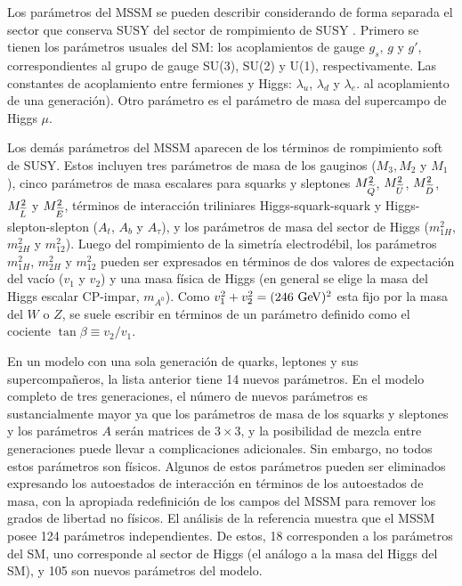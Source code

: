 Los parámetros del MSSM se pueden describir considerando de forma separada el
sector que conserva SUSY del sector de rompimiento de SUSY
\cite{PDG,Haber:1993wf}. Primero se tienen los parámetros usuales del SM: los
acoplamientos de gauge $g_s$, $g$ y $g'$, correspondientes al grupo de gauge
SU(3), SU(2) y U(1), respectivamente. Las constantes de acoplamiento entre
fermiones y Higgs: $\lambda_u$, $\lambda_d$ y $\lambda_e$. %
al acoplamiento de una generación).
Otro parámetro es el parámetro de masa del supercampo de Higgs $\mu$.

Los demás parámetros del MSSM aparecen de los términos de rompimiento soft de
SUSY. Estos incluyen tres parámetros de masa de los gauginos ($M_3, M_2$ y
$M_1$), cinco parámetros de masa escalares para squarks y sleptones
$M^2_{\widetilde{Q}}$, $M^2_{\widetilde{U}}$, $M^2_{\widetilde{D}}$, $M^2_{\widetilde{L}}$ y
$M^2_{\widetilde{E}}$, términos de interacción triliniares Higgs-squark-squark y
Higgs-slepton-slepton ($A_t$, $A_b$ y $A_\tau$), y los parámetros de masa del
sector de Higgs ($m^2_{1H}$, $m^2_{2H}$ y $m^2_{12}$). Luego del rompimiento de
la simetría electrodébil, los parámetros $m^2_{1H}$, $m^2_{2H}$ y $m^2_{12}$
pueden ser expresados en términos de dos valores de expectación del vacío ($v_1$
y $v_2$) y una masa física de Higgs (en general se elige la masa del Higgs
escalar CP-impar, $m_{A^0}$). Como $v_1^2+v_2^2=(246 \gev)^2$ esta fijo por la
masa del $W$ o $Z$, se suele escribir en términos de un parámetro definido como
el cociente $\tan \beta \equiv v_2/v_1$.

En un modelo con una sola generación de quarks, leptones y sus
supercompa\~neros, la lista anterior tiene 14 nuevos parámetros. En el modelo
completo de tres generaciones, el número de nuevos parámetros es sustancialmente
mayor ya que los parámetros de masa de los squarks y sleptones y los parámetros
$A$ serán matrices de $3 \times 3$, y la posibilidad de mezcla entre
generaciones puede llevar a complicaciones adicionales. Sin embargo, no todos
estos parámetros son físicos. Algunos de estos parámetros pueden ser eliminados
expresando los autoestados de interacción en términos de los autoestados de
masa, con la apropiada redefinición de los campos del MSSM para remover los
grados de libertad no físicos. El análisis de la referencia
\cite{Dimopoulos:1995ju} muestra que el MSSM posee 124 parámetros
independientes. De estos, 18 corresponden a los parámetros del SM, uno
corresponde al sector de Higgs (el análogo a la masa del Higgs del SM), y 105
son nuevos parámetros del modelo.

